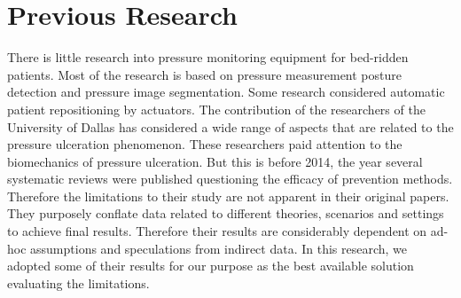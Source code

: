 \section{Previous Research}
There is little research into pressure monitoring equipment for bed-ridden patients. Most of the research is based on pressure measurement posture detection and pressure image segmentation. Some research considered automatic patient repositioning by actuators. \cite{smartmat,smartmat2}  The contribution of the researchers of the University of Dallas has considered a wide range of aspects that are related to the pressure ulceration phenomenon. \cite{schedule}  These researchers paid attention to the biomechanics of pressure ulceration. But this is before 2014, the year several systematic reviews were published questioning the efficacy of prevention methods. Therefore the limitations to their study are not apparent in their original papers. They purposely conflate data related to different theories, scenarios and settings to achieve final results. Therefore their results are considerably dependent on ad-hoc assumptions and speculations from indirect data. In this research, we adopted some of their results for our purpose as the best available solution evaluating the limitations.


